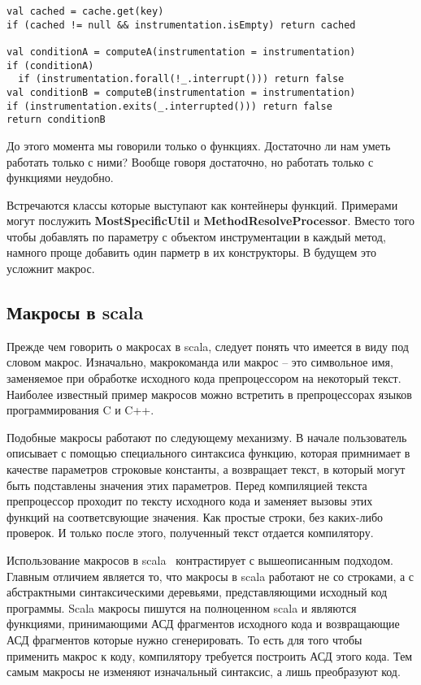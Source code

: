 \begin{lstlisting}[caption={Влияние на первоначальную логику},label=lst:cond]
val cached = cache.get(key)
if (cached != null && instrumentation.isEmpty) return cached

val conditionA = computeA(instrumentation = instrumentation)
if (conditionA)
  if (instrumentation.forall(!_.interrupt())) return false
val conditionB = computeB(instrumentation = instrumentation)
if (instrumentation.exits(_.interrupted())) return false
return conditionB
\end{lstlisting}

До этого момента мы говорили только о функциях.
Достаточно ли нам уметь работать только с ними?
Вообще говоря достаточно, но работать только с функциями неудобно.

Встречаются классы которые выступают как контейнеры функций.
Примерами могут послужить \textbf{MostSpecificUtil} и
\textbf{MethodResolveProcessor}.
Вместо того чтобы добавлять по параметру с объектом инструментации в каждый
метод, намного проще добавить один парметр в их конструкторы.
В будущем это усложнит макрос. %

\subsection{Макросы в scala}
\label{sec:macroScala}

Прежде чем говорить о макросах в scala, следует понять что имеется в виду под
словом макрос.
Изначально, макрокоманда или макрос -- это символьное имя,
заменяемое при обработке исходного кода препроцессором на некоторый текст.
Наиболее известный пример макросов можно встретить в препроцессорах языков
программирования C и C++.

Подобные макросы работают по следующему механизму.
В начале пользователь описывает с помощью специального синтаксиса функцию,
которая примнимает в качестве параметров строковые константы, а возвращает текст,
в который могут быть подставлены значения этих параметров.
Перед компиляцией текста препроцессор проходит по тексту исходного кода и заменяет
вызовы этих функций на соответсвующие значения.
Как простые строки, без каких-либо проверок.
И только после этого, полученный текст отдается компилятору.

Использование макросов в scala~\cite{macros} контрастирует с вышеописанным подходом.
Главным отличием является то, что макросы в scala работают не со строками,
а с абстрактными синтаксическими деревьями, представляющими исходный код
программы.
Scala макросы пишутся на полноценном scala и являются функциями, принимающими
АСД фрагментов исходного кода и возвращающие АСД фрагментов которые нужно
сгенерировать.
То есть для того чтобы применить макрос к коду, компилятору требуется построить
АСД этого кода. Тем самым макросы не изменяют изначальный синтаксис, а лишь
преобразуют код.

